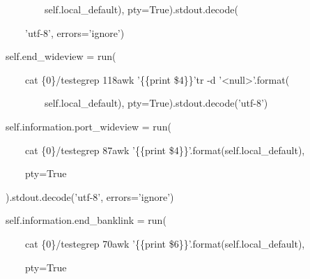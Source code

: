                     {\ttfamily\color[rgb]{0.10980392,0.10980392,0.10980392}
                    \ \ \ \ \ \ \ \ \ \ \ \ \ \ \ \ self.local\_default), pty=True).stdout.decode(}

                    {\ttfamily\color[rgb]{0.10980392,0.10980392,0.10980392}
                    \ \ \ \ \ \ \ \ \ \ \ \ {}'utf-8', errors='ignore')}


                    \bigskip

{\ttfamily\color[rgb]{0.10980392,0.10980392,0.10980392}
    \ \ \ \ \ \ \ \ self.end\_wideview = run(}

            {\ttfamily\color[rgb]{0.10980392,0.10980392,0.10980392}
            \ \ \ \ \ \ \ \ \ \ \ \ {\textquotedbl}cat \{0\}/teste{\textbar}grep 118{\textbar}awk '\{\{print \$4\}\}'{\textbar}tr -d
            '{\textless}null{\textgreater}'{\textquotedbl}.format(}

                    {\ttfamily\color[rgb]{0.10980392,0.10980392,0.10980392}
                    \ \ \ \ \ \ \ \ \ \ \ \ \ \ \ \ self.local\_default), pty=True).stdout.decode('utf-8')}


    \bigskip

{\ttfamily\color[rgb]{0.10980392,0.10980392,0.10980392}
    \ \ \ \ \ \ \ \ self.information.port\_wideview = run(}

            {\ttfamily\color[rgb]{0.10980392,0.10980392,0.10980392}
            \ \ \ \ \ \ \ \ \ \ \ \ {\textquotedbl}cat \{0\}/teste{\textbar}grep 87{\textbar}awk '\{\{print
            \$4\}\}'{\textquotedbl}.format(self.local\_default),}

            {\ttfamily\color[rgb]{0.10980392,0.10980392,0.10980392}
            \ \ \ \ \ \ \ \ \ \ \ \ pty=True}

            {\ttfamily\color[rgb]{0.10980392,0.10980392,0.10980392}
            \ \ \ \ \ \ \ \ ).stdout.decode('utf-8', errors='ignore')}


    \bigskip

{\ttfamily\color[rgb]{0.10980392,0.10980392,0.10980392}
    \ \ \ \ \ \ \ \ self.information.end\_banklink = run(}

            {\ttfamily\color[rgb]{0.10980392,0.10980392,0.10980392}
            \ \ \ \ \ \ \ \ \ \ \ \ {\textquotedbl}cat \{0\}/teste{\textbar}grep 70{\textbar}awk '\{\{print
            \$6\}\}'{\textquotedbl}.format(self.local\_default),}

            {\ttfamily\color[rgb]{0.10980392,0.10980392,0.10980392}
            \ \ \ \ \ \ \ \ \ \ \ \ pty=True}

